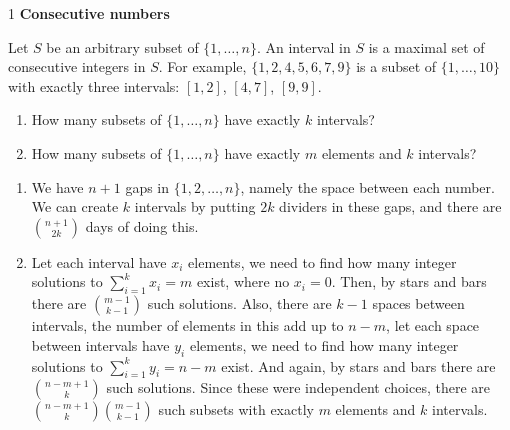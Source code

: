 \documentclass[12pt]{article}
\begin{document}


\begin{problem}{1} \textbf{Consecutive numbers}

Let $S$ be an arbitrary subset of $\{1, \dots, n\}$. An interval in $S$ is a maximal set of consecutive integers in $S$. For example, $\{1,2,4,5,6,7,9\}$ is a subset of $\{1, \dots, 10\}$ with exactly three intervals: $[1,2]$, $[4,7]$, $[9,9]$.

\begin{enumerate}
    \item How many subsets of $\{1, \dots, n\}$ have exactly $k$ intervals?
    \item How many subsets of $\{1, \dots, n\}$ have exactly $m$ elements and $k$ intervals?
\end{enumerate}
\end{problem}


\begin{solution}
    \bbni
    \begin{enumerate}
        \item We have $n+1$ gaps in $\{1, 2, \ldots, n\}$, namely the space between each number. We can create $k$ intervals by putting $2k$ dividers in these gaps, and there are $\binom{n+1}{2k}$ days of doing this. 
        
        \item Let each interval have $x_i$ elements, we need to find how many integer solutions to $\sum_{i=1}^kx_i = m$ exist, where no $x_i = 0$. 
        Then, by stars and bars there are $\binom{m-1}{k-1}$ such solutions.
        Also, there are $k-1$ spaces between intervals, the number of elements in this add up to $n-m$, let each space between intervals have $y_i$ elements, we need to find how many integer solutions to $\sum_{i=1}^ky_i = n-m$ exist. 
        And again, by stars and bars there are $\binom{n-m+1}{k}$ such solutions.
        Since these were independent choices, there are $\binom{n-m+1}{k}\binom{m-1}{k-1}$ such subsets with exactly $m$ elements and $k$ intervals.  
    \end{enumerate}
\end{solution}

\newpage 
\end{document}
